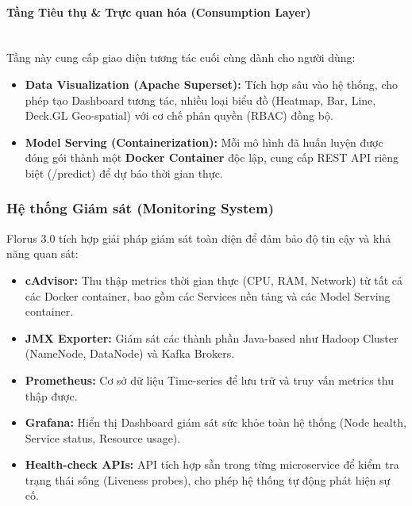\paragraph{Tầng Tiêu thụ \& Trực quan hóa (Consumption Layer)}
\mbox{}\\
Tầng này cung cấp giao diện tương tác cuối cùng dành cho người dùng:

\begin{itemize}
    \item \textbf{Data Visualization (Apache Superset):} Tích hợp sâu vào hệ thống, cho phép tạo Dashboard tương tác, nhiều loại biểu đồ (Heatmap, Bar, Line, Deck.GL Geo-spatial) với cơ chế phân quyền (RBAC) đồng bộ.
    \item \textbf{Model Serving (Containerization):} Mỗi mô hình đã huấn luyện được đóng gói thành một \textbf{Docker Container} độc lập, cung cấp REST API riêng biệt (/predict) để dự báo thời gian thực.
\end{itemize}

\subsubsection{Hệ thống Giám sát (Monitoring System)}
Florus 3.0 tích hợp giải pháp giám sát toàn diện để đảm bảo độ tin cậy và khả năng quan sát:

\begin{itemize}
    \item \textbf{cAdvisor:} Thu thập metrics thời gian thực (CPU, RAM, Network) từ tất cả các Docker container, bao gồm các Services nền tảng và các Model Serving container.
    \item \textbf{JMX Exporter:} Giám sát các thành phần Java-based như Hadoop Cluster (NameNode, DataNode) và Kafka Brokers.
    \item \textbf{Prometheus:} Cơ sở dữ liệu Time-series để lưu trữ và truy vấn metrics thu thập được.
    \item \textbf{Grafana:} Hiển thị Dashboard giám sát sức khỏe toàn hệ thống (Node health, Service status, Resource usage).
    \item \textbf{Health-check APIs:} API tích hợp sẵn trong từng microservice để kiểm tra trạng thái sống (Liveness probes), cho phép hệ thống tự động phát hiện sự cố.
\end{itemize}

    

